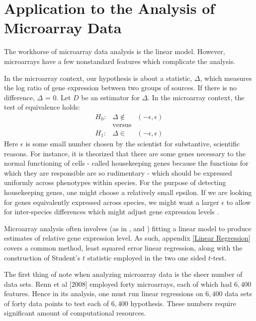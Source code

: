\chapter{Application to the Analysis of Microarray Data}

\label{Analysis of Microarray Data}

The workhorse of microarray data analysis is the linear model. However, microarrays have a few nonstandard features which complicate the analysis.

 
 In the microarray context, our hypothesis is about a statistic, $\Delta$, which measures the log ratio of gene expression between two groups of sources. If there is no difference, $\Delta$ = 0. Let $D$ be an estimator for $\Delta$. In the microarray context, the test of equivalence holds:
 \begin{eqnarray} 
 H_0: &  \Delta  \notin & (-\epsilon, \epsilon)   \nonumber \\
 & \mbox{versus}& \label{ToEQ}\\
 H_1: &  \Delta  \in &  (-\epsilon, \epsilon) \nonumber
 \end{eqnarray}
Here $\epsilon$ is some small number chosen by the scientist for substantive, scientific reasons. For instance, it is theorized that there are some genes necessary to the normal functioning of cells - called housekeeping genes because the functions for which they are responsible are so rudimentary - which should be expressed uniformly across phenotypes within species. For the purpose of detecting housekeeping genes, one might choose a relatively small epsilon. If we are looking for genes equivalently expressed across species, we might want a larger $\epsilon$ to allow for inter-species differences which might adjust gene expression levels \cite{QiuandCui}.

Microarray analysis often involves (as in \cite{adjaye}, \cite{Renn} and \cite{rodriguez}) fitting a linear model to produce estimates of relative gene expression level. As such,  appendix \ref{Linear Regression} covers a common method, least squared error linear regression, along with the construction of Student's $t$ statistic employed in the two one sided $t$-test. 

The first thing of note when analyzing microarray data is the sheer number of data sets. Renn et al [2008] employed forty microarrays, each of which had $6,400$ features. Hence in its analysis, one must run linear regressions on $6,400$ data sets of forty data points to test each of $6,400$ hypothesis. These numbers require significant amount of computational resources.

